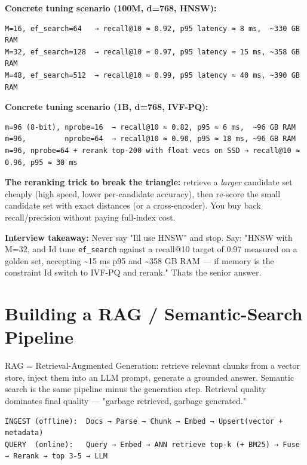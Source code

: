 \documentclass[11pt]{article}
\begin{document}
\textbf{Concrete tuning scenario (100M, d=768, HNSW):}

\setcodelang{}

\begin{verbatim}
M=16, ef_search=64   → recall@10 ≈ 0.92, p95 latency ≈ 8 ms,  ~330 GB RAM
M=32, ef_search=128  → recall@10 ≈ 0.97, p95 latency ≈ 15 ms, ~358 GB RAM
M=48, ef_search=512  → recall@10 ≈ 0.99, p95 latency ≈ 40 ms, ~390 GB RAM
\end{verbatim}

\textbf{Concrete tuning scenario (1B, d=768, IVF-PQ):}

\setcodelang{}

\begin{verbatim}
m=96 (8-bit), nprobe=16  → recall@10 ≈ 0.82, p95 ≈ 6 ms,  ~96 GB RAM
m=96,         nprobe=64  → recall@10 ≈ 0.90, p95 ≈ 18 ms, ~96 GB RAM
m=96, nprobe=64 + rerank top-200 with float vecs on SSD → recall@10 ≈ 0.96, p95 ≈ 30 ms
\end{verbatim}

\textbf{The reranking trick to break the triangle:} retrieve a \emph{larger} candidate set cheaply (high speed, lower per-candidate accuracy), then re-score the small candidate set with exact distances (or a cross-encoder). You buy back recall/precision without paying full-index cost.

\textbf{Interview takeaway:} Never say "I\textquotesingle ll use HNSW" and stop. Say: "HNSW with M=32, and I\textquotesingle d tune \texttt{ef\_search} against a recall@10 target of 0.97 measured on a golden set, accepting \textasciitilde15 ms p95 and \textasciitilde358 GB RAM --- if memory is the constraint I\textquotesingle d switch to IVF-PQ and rerank." That\textquotesingle s the senior answer.

\section{Building a RAG / Semantic-Search Pipeline}\label{building-a-rag--semantic-search-pipeline}

RAG = Retrieval-Augmented Generation: retrieve relevant chunks from a vector store, inject them into an LLM prompt, generate a grounded answer. Semantic search is the same pipeline minus the generation step. Retrieval quality dominates final quality --- "garbage retrieved, garbage generated."

\setcodelang{}

\begin{verbatim}
INGEST (offline):  Docs → Parse → Chunk → Embed → Upsert(vector + metadata)
QUERY  (online):   Query → Embed → ANN retrieve top-k (+ BM25) → Fuse → Rerank → top 3-5 → LLM
\end{verbatim}
\end{document}
